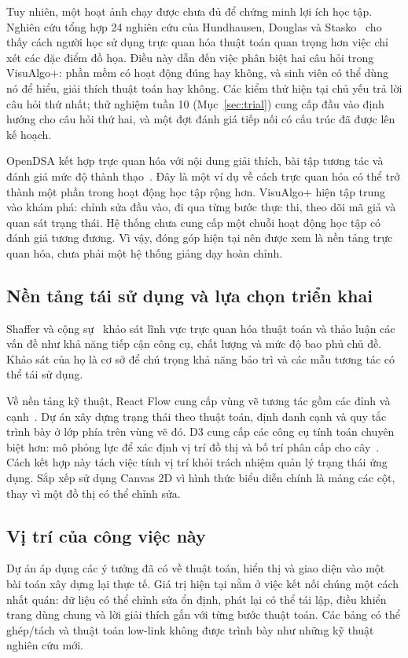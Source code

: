 \documentclass[11pt,a4paper]{article}
\begin{document}
Tuy nhiên, một hoạt ảnh chạy được chưa đủ để chứng minh lợi ích học tập. Nghiên cứu tổng hợp 24 nghiên cứu của Hundhausen, Douglas và Stasko~\cite{hundhausen2002} cho thấy cách người học sử dụng trực quan hóa thuật toán quan trọng hơn việc chỉ xét các đặc điểm đồ họa. Điều này dẫn đến việc phân biệt hai câu hỏi trong VisuAlgo+: phần mềm có hoạt động đúng hay không, và sinh viên có thể dùng nó để hiểu, giải thích thuật toán hay không. Các kiểm thử hiện tại chủ yếu trả lời câu hỏi thứ nhất; thử nghiệm tuần 10 (Mục~\ref{sec:trial}) cung cấp đầu vào định hướng cho câu hỏi thứ hai, và một đợt đánh giá tiếp nối có cấu trúc đã được lên kế hoạch.

OpenDSA kết hợp trực quan hóa với nội dung giải thích, bài tập tương tác và đánh giá mức độ thành thạo~\cite{opendsa}. Đây là một ví dụ về cách trực quan hóa có thể trở thành một phần trong hoạt động học tập rộng hơn. VisuAlgo+ hiện tập trung vào khám phá: chỉnh sửa đầu vào, đi qua từng bước thực thi, theo dõi mã giả và quan sát trạng thái. Hệ thống chưa cung cấp một chuỗi hoạt động học tập có đánh giá tương đương. Vì vậy, đóng góp hiện tại nên được xem là nền tảng trực quan hóa, chưa phải một hệ thống giảng dạy hoàn chỉnh.

\subsection{Nền tảng tái sử dụng và lựa chọn triển khai}
Shaffer và cộng sự~\cite{shaffer2010} khảo sát lĩnh vực trực quan hóa thuật toán và thảo luận các vấn đề như khả năng tiếp cận công cụ, chất lượng và mức độ bao phủ chủ đề. Khảo sát của họ là cơ sở để chú trọng khả năng bảo trì và các mẫu tương tác có thể tái sử dụng.

Về nền tảng kỹ thuật, React Flow cung cấp vùng vẽ tương tác gồm các đỉnh và cạnh~\cite{reactflow}. Dự án xây dựng trạng thái theo thuật toán, định danh cạnh và quy tắc trình bày ở lớp phía trên vùng vẽ đó. D3 cung cấp các công cụ tính toán chuyên biệt hơn: mô phỏng lực để xác định vị trí đồ thị và bố trí phân cấp cho cây~\cite{d3}. Cách kết hợp này tách việc tính vị trí khỏi trách nhiệm quản lý trạng thái ứng dụng. Sắp xếp sử dụng Canvas 2D vì hình thức biểu diễn chính là mảng các cột, thay vì một đồ thị có thể chỉnh sửa.

\subsection{Vị trí của công việc này}
Dự án áp dụng các ý tưởng đã có về thuật toán, hiển thị và giao diện vào một bài toán xây dựng lại thực tế. Giá trị hiện tại nằm ở việc kết nối chúng một cách nhất quán: dữ liệu có thể chỉnh sửa ổn định, phát lại có thể tái lập, điều khiển trang dùng chung và lời giải thích gắn với từng bước thuật toán. Các bảng có thể ghép/tách và thuật toán low-link không được trình bày như những kỹ thuật nghiên cứu mới.
\end{document}
